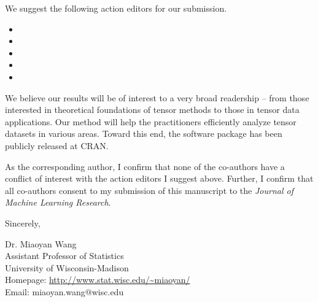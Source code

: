 \documentclass{article}
\begin{document}
We suggest the following action editors for our submission.

\begin{itemize}
    \item {}
    \item {}
    \item {}   
    \item {}
    \item {}
\end{itemize}


We believe our results will be of interest to a very broad readership -- from those interested in theoretical foundations of tensor methods to those in tensor data applications. Our method will help the practitioners efficiently analyze tensor datasets in various areas. Toward this end, the software package has been publicly released at CRAN.


As the corresponding author, I confirm that none of the co-authors have a conflict of interest with the action editors I suggest above. Further, I confirm that all co-authors consent to my submission of this manuscript to the \emph{Journal of Machine Learning Research}.

\bigskip

Sincerely,

\medskip

Dr. Miaoyan Wang\\
Assistant Professor of Statistics\\
University of Wisconsin-Madison\\
Homepage: \url{http://www.stat.wisc.edu/~miaoyan/} \\
Email: miaoyan.wang@wisc.edu
\end{document}
